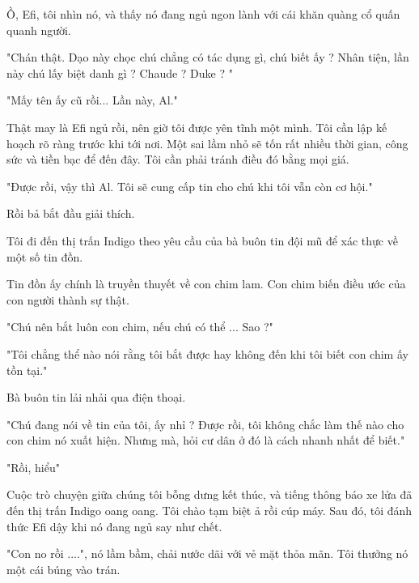 Ồ, Efi, tôi nhìn nó, và thấy nó đang ngủ ngon lành với cái khăn quàng cổ quấn quanh người. 

"Chán thật. Dạo này chọc chú chẳng có tác dụng gì, chú biết ấy ? Nhân tiện, lần này chú lấy biệt danh gì ? Chaude ? Duke ? "

"Mấy tên ấy cũ rồi... Lần này, Al."

Thật may là Efi ngủ rồi, nên giờ tôi được yên tĩnh một mình. Tôi cần lập kế hoạch rõ ràng trước khi tới nơi. Một sai lầm nhỏ sẽ tốn rất nhiều thời gian, công sức và tiền bạc để đến đây. Tôi cần phải tránh điều đó bằng mọi giá.

"Được rồi, vậy thì Al. Tôi sẽ cung cấp tin cho chú khi tôi vẫn còn cơ hội."

Rồi bả bắt đầu giải thích. 

Tôi đi đến thị trấn Indigo theo yêu cầu của bà buôn tin đội mũ để xác thực về một số tin đồn. 

Tin đồn ấy chính là truyền thuyết về con chim lam. Con chim biến điều ước của con người thành sự thật.
 
"Chú nên bắt luôn con chim, nếu chú có thể ... Sao ?"

"Tôi chẳng thể nào nói rằng tôi bắt được hay không đến khi tôi biết con chim ấy tồn tại."

Bà buôn tin lải nhải qua điện thoại.

"Chú đang nói về tin của tôi, ấy nhỉ ? Được rồi, tôi không chắc làm thế nào cho con chim nó xuất hiện. Nhưng mà, hỏi cư dân ở đó là cách nhanh nhất để biết."

"Rồi, hiểu"

Cuộc trò chuyện giữa chúng tôi bỗng dưng kết thúc, và tiếng thông báo xe lửa đã đến thị trấn Indigo oang oang. Tôi chào tạm biệt ả rồi cúp máy. Sau đó, tôi đánh thức Efi dậy khi nó đang ngủ say như chết. 

"Con no rồi ....", nó lầm bầm, chải nước dãi với vẻ mặt thỏa mãn. Tôi thưởng nó một cái búng vào trán. \\













